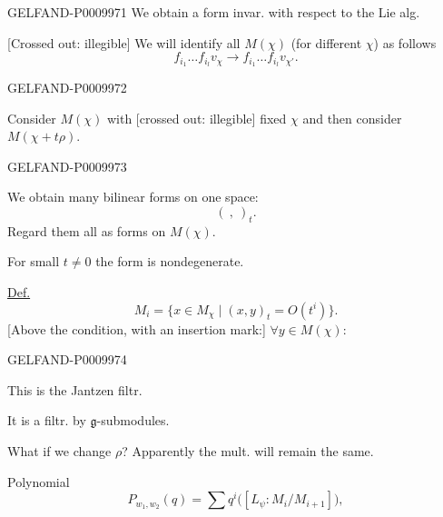 \begin{GelfandAdjacentEvidence}{GELFAND-P000997}{1}
We obtain a form invar. with respect to the Lie alg.

[Crossed out: illegible] We will identify all $M(\chi)$ (for different $\chi$) as follows
\[
f_{i_1}\ldots f_{i_l}v_\chi
\longrightarrow f_{i_1}\ldots f_{i_l}v_{\chi'}.
\]
\end{GelfandAdjacentEvidence}
\begin{GelfandAdjacentEvidence}{GELFAND-P000997}{2}


Consider $M(\chi)$ with [crossed out: illegible] fixed $\chi$ and then consider $M(\chi+t\rho)$.
\end{GelfandAdjacentEvidence}
\begin{GelfandAdjacentEvidence}{GELFAND-P000997}{3}


We obtain many bilinear forms on one space:
\[
(\ ,\ )_t.
\]
Regard them all as forms on $M(\chi)$.

For small $t\ne0$ the form is nondegenerate.

\underline{Def.}
\[
M_i=\{x\in M_\chi\mid (x,y)_t=O(t^i)\}.
\]
[Above the condition, with an insertion mark:] $\forall y\in M(\chi):$
\end{GelfandAdjacentEvidence}
\begin{GelfandAdjacentEvidence}{GELFAND-P000997}{4}


This is the Jantzen filtr.

It is a filtr. by $\mathfrak g$-submodules.

What if we change $\rho$? Apparently the mult. will remain the same.

Polynomial
\[
P_{w_1,w_2}(q)=\sum q^i\bigl([L_\psi:M_i/M_{i+1}]\bigr),
\]
\end{GelfandAdjacentEvidence}
